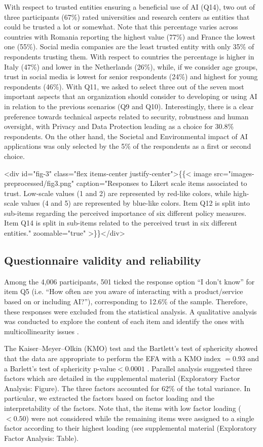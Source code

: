 \documentclass{article}
\begin{document}
With respect to trusted entities ensuring a beneficial use of AI (Q14), two out of three participants (67\%) rated universities and research centers as entities that could be trusted a lot or somewhat. Note that this percentage varies across countries with Romania reporting the highest value (77\%) and France the lowest one (55\%). 
Social media companies are the least trusted entity with only 35\% of respondents trusting them. With respect to countries the percentage is higher in Italy (47\%) and lower in the Netherlands (26\%), while, if we consider age groups, trust in social media is lowest for senior respondents (24\%) and highest for young respondents (46\%). 
With Q11, we asked to select three out of the seven most important aspects that an organization should consider to developing or using AI in relation to the previous scenarios (Q9 and Q10).
Interestingly, there is a clear preference towards technical aspects related to security, robustness and human oversight, with Privacy and Data Protection leading as a choice for 30.8\% respondents. On the other hand, the Societal and Environmental impact of AI applications was only selected by the 5\% of the respondents as a first or second choice. 

<div id="fig-3" class="flex items-center justify-center">\{\{< image src="images-preprocessed/fig3.png" caption="Responses to Likert scale items associated to trust. Low-scale values (1 and 2) are represented by red-like colors, while high-scale values (4 and 5) are represented by blue-like colors. Item Q12 is split into sub-items regarding the perceived importance of six different policy measures. Item Q14 is split in sub-items related to the perceived trust in six different entities." zoomable="true" >\}\}</div>



\subsection{Questionnaire validity and reliability} 
Among the 4,006 participants, 501 ticked the response option ``I don't know'' for item Q5 (i.e. ``How often are you aware of interacting with a product/service based on or including AI?''), corresponding to 12.6\% of the sample. Therefore, these responses were excluded from the statistical analysis. A qualitative analysis was conducted to explore the content of each item and identify the ones with multicollinearity issues \cite{cohen2017,joreskog1994}.

The Kaiser–Meyer–Olkin (KMO) test and the Bartlett’s test of sphericity showed that the data are appropriate to perform the EFA with a KMO index $=0.93$ and a Barlett's test of sphericity p-value$<0.0001$ \cite{Kaiser1974,Fabrigar1999}. 
Parallel analysis suggested three factors which are detailed in the supplemental material (Exploratory Factor Analysis: Figure). The three factors accounted for 62\% of the total variance. In particular, we extracted the factors based on factor loading and the interpretability of the factors. Note that, the items with low factor loading ($<0.50$) were not considered while the remaining items were assigned to a single factor according to their highest loading (see supplemental material (Exploratory Factor Analysis: Table).
\end{document}
